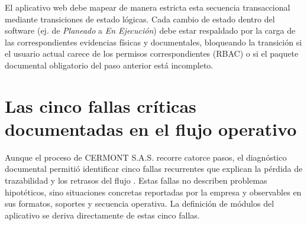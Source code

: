 El aplicativo web debe mapear de manera estricta esta secuencia transaccional mediante transiciones de estado lógicas. Cada cambio de estado dentro del software (ej. de \textit{Planeado} a \textit{En Ejecución}) debe estar respaldado por la carga de las correspondientes evidencias físicas y documentales, bloqueando la transición si el usuario actual carece de los permisos correspondientes (RBAC) o si el paquete documental obligatorio del paso anterior está incompleto.

\section{Las cinco fallas críticas documentadas en el flujo operativo}
\label{sec:cinco-fallas-criticas}

Aunque el proceso de CERMONT S.A.S. recorre catorce pasos, el diagnóstico documental permitió identificar cinco fallas recurrentes que explican la pérdida de trazabilidad y los retrasos del flujo \cite{proceso_cermont}. Estas fallas no describen problemas hipotéticos, sino situaciones concretas reportadas por la empresa y observables en sus formatos, soportes y secuencia operativa. La definición de módulos del aplicativo se deriva directamente de estas cinco fallas.

